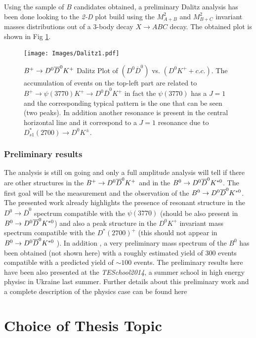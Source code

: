 \documentclass[paper=a4, fontsize=10pt]{scrartcl}
\numberwithin{equation}{section}		%
\numberwithin{figure}{section}			%
\numberwithin{table}{section}				%
\begin{document}
Using the sample of $B$ candidates obtained,  a preliminary Dalitz analysis has been done looking to the \textit{2-D} plot build using the $M^{2}_{A+B}$ and $M^{2}_{B+C}$ invariant masses distributions out of a 3-body decay $X\rightarrow ABC$ decay. The obtained plot is shown in Fig \ref{Dalitz}.
\begin{figure}[h!]
\begin{center}
\texttt{[image: Images/Dalitz1.pdf]}
\caption{$B^{+} \rightarrow D^0 \overline{D}^{0} K^{+}$ Dalitz Plot of $(D^{0}\overline{D}^{0})$ vs. $(D^{0}K^{+}+c.c.)$. The accumulation of events on the top-left part are related to $B^{+}\rightarrow \psi(3770)K^{+}\rightarrow D^{0}\overline{D}^{0} K^{+}$ in fact the $\psi(3770)$ has a $J=1$ and the corresponding typical pattern is the one that can be seen (two peaks). In addition another resonance is present in the central horizontal line and it correspond to a $J=1$ resonance due to $D^{*}_{s1}(2700)\rightarrow D^{0}K^{\pm}$.}\label{Dalitz}
\end{center}
\end{figure}

\subsubsection{Preliminary results}
The analysis is still on going and only a full amplitude analysis will tell if there are other structures in the $B^{+} \rightarrow D^0 \overline{D}^{0} K^{+}$ and in the $B^{0} \rightarrow D^0 \overline{D}^{0} K^{\ast 0}$. The first goal will be the measurement and the observation of the $B^{0} \rightarrow D^0 \overline{D}^{0} K^{\ast 0}$. The presented work already highlights the presence of resonant structure in the $D^{0} \rightarrow \overline{D} ^{0} $ spectrum compatible with the $\psi (3770)$ (should be also present in $B^{0} \rightarrow D^0 \overline{D}^{0} K^{\ast 0}$) and also a peak structure in the $D^{0} K^{+} $ invariant mass spectrum compatible with the $D^{*}(2700)^{+}$ (this should not appear in $B^{0} \rightarrow D^0 \overline{D}^{0} K^{\ast 0}$ ). In addition , a very preliminary mass spectrum of the $B^{0}$ has been obtained (not shown here) with a roughly estimated yield of 300 events compatible with a predicted yield of $\sim 100 $ events.
The preliminary results here have been also presented at the \textit{TESchool2014}, a summer school in high energy physisc in Ukraine last summer.
Further details about this preliminary work and a complete description of the physics case can be found here ~\cite{Tesi}

\section{Choice of Thesis Topic}
\end{document}
